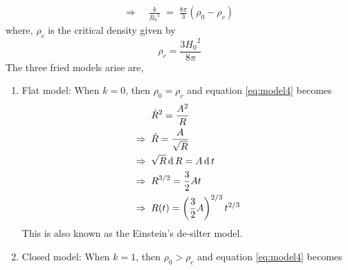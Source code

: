 \documentclass[../main-sheet.tex]{subfiles}
\begin{document}
\begin{soln}
\begin{align}
    \Rightarrow\;\;& \frac{k}{{R_0}^2}\;=\;\frac{8\pi}{3}\left( \rho_0-\rho_c \right)\label{eq:model6}
\end{align}
where, \(\rho_c\) is the critical density given by
\begin{equation}
    \rho_c=\frac{3{H_0}^2}{8\pi}\label{eq:model7}
\end{equation}
The three fried models arise are,
\begin{enumerate}[label=(\roman*)]
    \item Flat model: When \(k = 0\), then \(\rho_0=\rho_c\) and equation \eqref{eq:model4} becomes
    \begin{align*}
        &\dot{R}^2=\frac{A^2}{R }\\
        \Rightarrow\;\;&\dot{R}=\frac{A}{\sqrt{R} }\\
        \Rightarrow\;\;&\sqrt{R} \,\mathrm{d}\, R=A\,\mathrm{d}\, t \\
        \Rightarrow\;\;&{R}^{3/2} =\frac{3}{2}A t \\
        \Rightarrow\;\;&{R}(t)=\left(\frac{3}{2}A\right)^{2/3} t^{2/3}
    \end{align*}
    This is also known as the Einstein's de-silter model.
    \item Closed model: When \(k = 1\), then \(\rho_0>\rho_c\) and equation \eqref{eq:model4} becomes





\end{enumerate}
 



 
 
 
 
 
 
 
 
 
 




\end{soln}
\end{document}
